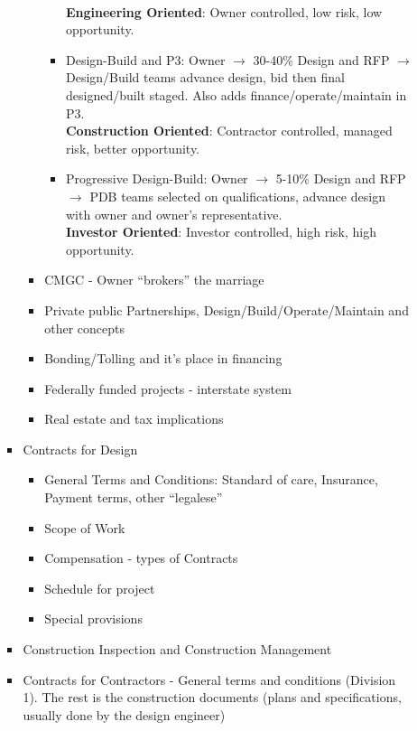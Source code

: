 \documentclass{article}
\begin{document}
\begin{itemize}
\begin{itemize}
\begin{itemize}
\begin{itemize}
\begin{itemize}
                        \\ \textbf{Engineering Oriented}: Owner controlled, low risk, low opportunity.
                        \item Design-Build and P3: Owner \(\rightarrow\) 30-40\% Design and RFP \(\rightarrow\) Design/Build teams advance design, bid then final designed/built staged. Also adds finance/operate/maintain in P3.
                        \\ \textbf{Construction Oriented}: Contractor controlled, managed risk, better opportunity.
                        \item Progressive Design-Build: Owner \(\rightarrow\) 5-10\% Design and RFP \(\rightarrow\) PDB teams selected on qualifications, advance design with owner and owner's representative.
                        \\ \textbf{Investor Oriented}: Investor controlled, high risk, high opportunity.
                    \end{itemize}
                    \item CMGC - Owner ``brokers'' the marriage
                    \item Private public Partnerships, Design/Build/Operate/Maintain and other concepts
                    \item Bonding/Tolling and it's place in financing
                    \item Federally funded projects - interstate system
                    \item Real estate and tax implications
                \end{itemize}
                \item Contracts for Design
                \begin{itemize}
                    \item General Terms and Conditions: Standard of care, Insurance, Payment terms, other ``legalese''
                    \item Scope of Work
                    \item Compensation - types of Contracts
                    \item Schedule for project
                    \item Special provisions
                \end{itemize}
                \item Construction Inspection and Construction Management
                \item Contracts for Contractors - General terms and conditions (Division 1). The rest is the construction documents (plans and specifications, usually done by the design engineer)

\end{itemize}
\end{itemize}
\end{itemize}
\end{document}
